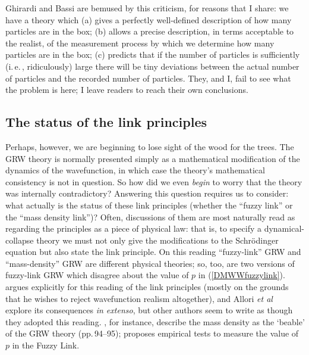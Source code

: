 \documentclass[12pt]{article}
\newcommand{\iec}{\mbox{i.\,e.\,}}
\begin{document}
Ghirardi and Bassi \citeyear{bassighirardi99,bassighirardireview} are bemused by this criticism, for reasons that I share: we have a theory which (a) gives a perfectly well-defined description of how many particles are in the box; (b) allows a precise description, in terms acceptable to the realist, of the measurement process by which we determine how many particles are in the box; (c) predicts that if the number of particles is sufficiently (\iec, ridiculously) large there will be tiny deviations between the actual number of particles and the recorded number of particles. They, and I, fail to see what the problem is here; I leave readers to reach their own conclusions.

\subsection{The status of the link principles}

Perhaps, however, we are beginning to lose sight of the wood for the trees. The GRW theory is normally presented simply as a mathematical modification of the dynamics of the wavefunction, in which case the theory's mathematical consistency is not in question. So how did we even \emph{begin} to worry that the theory was internally contradictory? 
Answering this question requires us to consider: what actually is the status of these link principles (whether the ``fuzzy link'' or the ``mass density link'')? Often, discussions of them are most naturally read as regarding the principles as a piece of physical law: that is, to specify a dynamical-collapse theory we must not only give the modifications to the Schr\"{o}dinger equation but also state the link principle. On this reading ``fuzzy-link'' GRW and ``mass-density'' GRW are different physical theories; so, too, are two versions of fuzzy-link GRW which disagree about the value of $p$ in (\ref{DMWWfuzzylink}).  argues explicitly for this reading of the link principles (mostly on the grounds that he wishes to reject wavefunction realism altogether), and Allori \emph{et al}~\citeyear{goldsteinontology} explore its consequences \emph{in extenso}, but other authors seem to write as though they adopted this reading. , for instance,  describe the mass density as the `beable' of the GRW theory (pp.\,94--95);  proposes empirical tests to measure the value of $p$ in the Fuzzy Link.
\end{document}
